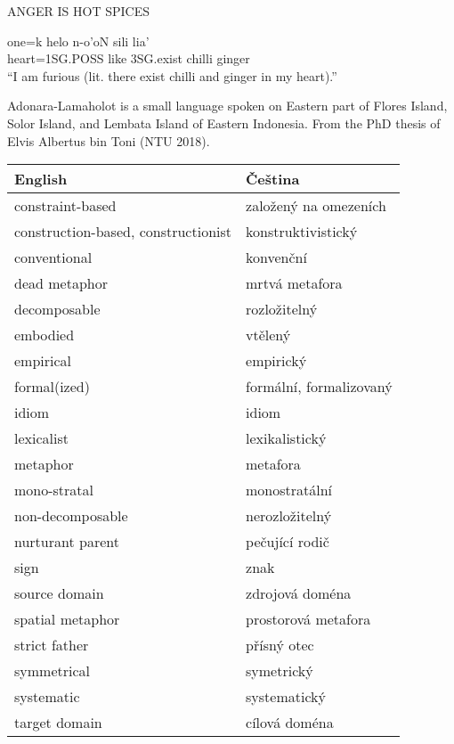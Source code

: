 \documentclass[a4paper,landscape,headrule,footrule,xetex]{foils}
\begin{document}

ANGER IS HOT SPICES
\begin{exe}
  \ex \gll one=k helo n-o'oN sili lia' \\
heart=1SG.POSS like 3SG.exist chilli ginger \\
\trans ``I am furious (lit. there exist chilli and ginger in my heart).''
\end{exe}

Adonara-Lamaholot is a small language spoken on Eastern part of Flores
Island, Solor Island, and Lembata Island of Eastern Indonesia.   From
the PhD thesis of Elvis Albertus bin Toni (NTU 2018).  


\begin{longtable}{ll}
  English & Čeština \\\hline \endhead
constraint-based & založený na omezeních \\
construction-based, constructionist & konstruktivistický \\
conventional & konvenční \\
dead metaphor & mrtvá metafora \\
decomposable & rozložitelný \\
embodied & vtělený \\
empirical & empirický \\
formal(ized) & formální, formalizovaný \\
idiom & idiom \\
lexicalist & lexikalistický \\
metaphor & metafora \\
mono-stratal & monostratální \\
non-decomposable & nerozložitelný \\
nurturant parent & pečující rodič \\
sign & znak \\
source domain & zdrojová doména \\
spatial metaphor & prostorová metafora \\
strict father & přísný otec \\
symmetrical & symetrický \\
systematic & systematický \\
target domain & cílová doména \\
\end{longtable}
\end{document}
